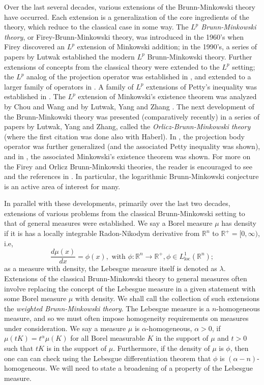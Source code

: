 \documentclass[11pt]{amsart}
\theoremstyle{definition}
\theoremstyle{remark}
\numberwithin{equation}{section}
\newcommand{\R}{\mathbb{R}}
\begin{document}
Over the last several decades, various extensions of the Brunn-Minkowski theory have occurred. Each extension is a generalization of the core ingredients of the theory, which reduce to the classical case in some way. The \textit{$L^p$ Brunn-Minkowski theory}, or Firey-Brunn-Minkowski theory, was introduced in the 1960's when Firey discovered an $L^p$ extension of Minkowski addition; in the 1990's, a series of papers by Lutwak \cite{LE93,LE96} established the modern $L^p$ Brunn-Minkowski theory. Further extensions of concepts from the classical theory were extended to the $L^p$ setting; the $L^p$ analog of the projection operator was established in \cite{LYZ00}, and extended to a larger family of operators in \cite{ML05}. A family of $L^p$ extensions of Petty's inequality was established in \cite{HS2009, HS09}. The $L^p$ extension of Minkowski's existence theorem was analyzed by Chou and Wang \cite{CW06} and by Lutwak, Yang and Zhang \cite{LYZ06}. The next development of the Brunn-Minkowski theory was presented (comparatively recently) in a series of papers by Lutwak, Yang and Zhang, called the \textit{Orlicz-Brunn-Minkowski theory} \cite{HLYZ10,LYZ10_2, LYZ10} (where the first citation was done also with Haberl). In \cite{LYZ10}, the projection body operator was further generalized (and the associated Petty inequality was shown), and in \cite{HLYZ10}, the associated Minkowski's existence theorem was shown. For more on the Firey and Orlicz Brunn-Minkowski theories, the reader is encouraged to see \cite{Sh1} and the references in \cite{LYZ10}. In particular, the logarithmic Brunn-Minkowski conjecture \cite{BLYZ12,BLYZ13} is an active area of interest for many.

 In parallel with these developments, primarily over the last two decades, extensions of various problems from the classical Brunn-Minkowski setting to that of general measures were established. We say a Borel measure $\mu$ has density if it is has a locally integrable Radon-Nikodym derivative from $\R^n$ to $\R^{+}=[0,\infty)$, i.e, 
\[
\frac{d\mu(x)}{dx} = \phi(x), \text{ with } \phi \colon \R^n \to \R^+,\phi\in L^1_{\text{loc}}(\R^n);
\]
as a measure with density, the Lebesgue measure itself is denoted as $\lambda.$ Extensions of the classical Brunn-Minkowski theory to general measures often involve replacing the concept of the Lebesgue measure in a given statement with some Borel measure $\mu$ with density. We shall call the collection of such extensions the \textit{weighted Brunn-Minkowski theory}. The Lebesgue measure is a $n$-homogeneous measure, and so we must often impose homogeneity requirements on measures under consideration. We say a measure $\mu$ is $\alpha$-homogeneous, $\alpha > 0$, if $\mu(tK)=t^\alpha\mu(K)$ for all Borel measurable $K$ in the support of $\mu$ and $t>0$ such that $tK$ is in the support of $\mu$. Furthermore, if the density of $\mu$ is $\phi$, then one can can check using the Lebesgue differentiation theorem that $\phi$ is $(\alpha-n)$-homogeneous. We will need to state a broadening of a property of the Lebesgue measure.
\end{document}

